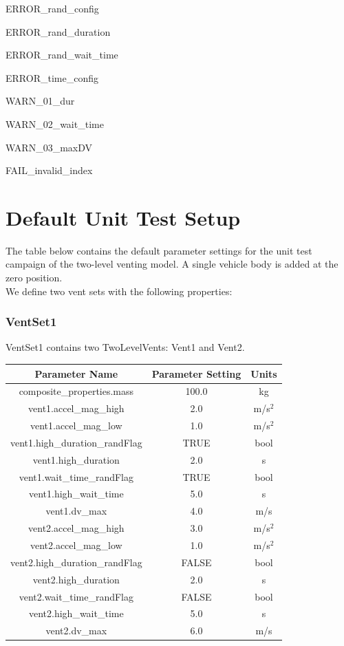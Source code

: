 \documentclass[11pt,fleqn]{report}
\begin{document}
ERROR\_rand\_config

ERROR\_rand\_duration

ERROR\_rand\_wait\_time

ERROR\_time\_config

WARN\_01\_dur

WARN\_02\_wait\_time

WARN\_03\_maxDV

FAIL\_invalid\_index


\newpage
\section{Default Unit Test Setup}

\noindent The table below contains the default parameter settings for the unit test campaign of the two-level venting model.
A single vehicle body is added at the zero position. \\

We define two vent sets with the following properties:

\subsubsection{VentSet1}
VentSet1 contains two TwoLevelVents: Vent1 and Vent2.

\begin{table}[!ht]
    \centering
    \begin{tabular}{|c|c|c|} \hline
    \textbf{Parameter Name} & \textbf{Parameter Setting} & \textbf{Units} \\
    \hline
    composite\_properties.mass & 100.0 & kg \\
    \hline
    vent1.accel\_mag\_high & 2.0 & m/s$^{2}$ \\
    \hline
    vent1.accel\_mag\_low & 1.0 & m/s$^{2}$ \\
    \hline
    vent1.high\_duration\_randFlag & TRUE & bool \\
    \hline
    vent1.high\_duration & 2.0 & s \\
    \hline
    vent1.wait\_time\_randFlag & TRUE & bool \\
    \hline
    vent1.high\_wait\_time & 5.0 & s \\
    \hline
    vent1.dv\_max & 4.0 & m/s \\
    \hline
    vent2.accel\_mag\_high & 3.0 & m/s$^{2}$ \\
    \hline
    vent2.accel\_mag\_low & 1.0 & m/s$^{2}$ \\
    \hline
    vent2.high\_duration\_randFlag & FALSE & bool \\
    \hline
    vent2.high\_duration & 2.0 & s \\
    \hline
    vent2.wait\_time\_randFlag & FALSE & bool \\
    \hline
    vent2.high\_wait\_time & 5.0 & s \\
    \hline
    vent2.dv\_max & 6.0 & m/s \\
    \hline
    \end{tabular}
\end{table}
\end{document}

